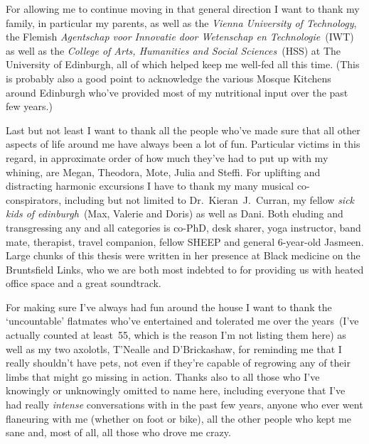 \documentclass[oneside]{book}
\begin{document}
For allowing me to continue moving in that general direction I want to thank my family, in particular my parents, as well as the \emph{Vienna University of Technology}, the Flemish \emph{Agentschap voor Innovatie door Wetenschap en Technologie}~(IWT) as well as the \emph{College of Arts, Humanities and Social Sciences}~(HSS) at The University of Edinburgh, all of which helped keep me well-fed all this time. (This is probably also a good point to acknowledge the various Mosque Kitchens around Edinburgh who've provided most of my nutritional input over the past few years.)

Last but not least I want to thank all the people who've made sure that all other aspects of life around me have always been a lot of fun. Particular victims in this regard, in approximate order of how much they've had to put up with my whining, are Megan, Theodora, Mote, Julia and Steffi.
For uplifting and distracting harmonic excursions I have to thank my many musical co-conspirators, including but not limited to Dr.~Kieran~J.~Curran, my fellow \emph{sick kids of edinburgh}~(Max, Valerie and Doris) as well as Dani.
Both eluding and transgressing any and all categories is co-PhD, desk sharer, yoga instructor, band mate, therapist, travel companion, fellow SHEEP and general 6-year-old Jasmeen. Large chunks of this thesis were written in her presence at Black medicine on the Bruntsfield Links, who we are both most indebted to for providing us with heated office space and a great soundtrack.

For making sure I've always had fun around the house I want to thank the `uncountable' flatmates who've entertained and tolerated me over the years~(I've actually counted at least~55, which is the reason I'm not listing them here) as well as my two axolotls, T'Nealle and D'Brickashaw, for reminding me that I really shouldn't have pets, not even if they're capable of regrowing any of their limbs that might go missing in action.
Thanks also to all those who I've knowingly or unknowingly omitted to name here, including everyone that I've had really \emph{intense} conversations with in the past few years, anyone who ever went flaneuring with me (whether on foot or bike), all the other people who kept me sane and, most of all, all those who drove me crazy.
\end{document}
